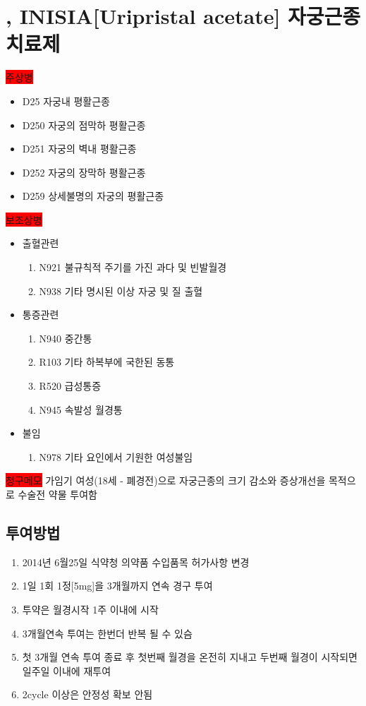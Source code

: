 \section{, INISIA[Uripristal acetate] 자궁근종 치료제}
\colorbox{red}{주상병}
\begin{itemize}\tightlist
\item D25 자궁내 평활근종
​\item D250 자궁의 점막하 평활근종
\item D251 자궁의 벽내 평활근종
\item D252 자궁의 장막하 평활근종
\item D259  상세불명의 자궁의 평활근종
\end{itemize}
 
\colorbox{red}{보조상병}
\begin{itemize}\tightlist
\item 출혈관련
	\begin{enumerate}\tightlist
	\item N921 불규칙적 주기를 가진 과다 및 빈발월경
	\item N938  기타 명시된 이상 자궁 및 질 출혈
	\end{enumerate}	
\item 통증관련
	\begin{enumerate}\tightlist
	\item N940 중간통
	\item R103 기타 하복부에 국한된 동통
	\item R520 급성통증
	\item N945 속발성 월경통
	\end{enumerate}	
\item 불임
	\begin{enumerate}\tightlist
	\item N978 기타 요인에서 기원한 여성불임
	\end{enumerate}
\end{itemize}

\colorbox{red}{청구메모}
가임기 여성(18세 - 폐경전)으로 자궁근종의 크기 감소와 증상개선을 목적으로  수술전 약물 투여함\\

\subsection{투여방법}
\begin{enumerate}\tightlist
\item 2014년 6월25일 식약청 의약품 수입품목 허가사항 변경
\item 1일 1회 1정[5mg]을 3개월까지 연속 경구 투여
\item 투약은 월경시작 1주 이내에 시작
\item 3개월연속 투여는 한번더 반복 될 수 있슴
\item 첫 3개월 연속 투여 종료 후 첫번째 월경을 온전히 지내고 두번째 월경이 시작되면 일주일 이내에 재투여
\item 2cycle 이상은 안정성 확보 안됨
\end{enumerate}

